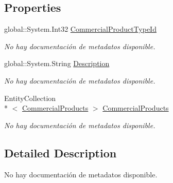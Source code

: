 \subsection*{Properties}
\begin{DoxyCompactItemize}
\item 
global\-::\-System.\-Int32 \hyperlink{class_game_memory_1_1_commercial_product_types_a259bcdf4dd877d8bae773e9c24bfe00d}{Commercial\-Product\-Type\-Id}
\begin{DoxyCompactList}\small\item\em No hay documentación de metadatos disponible. \end{DoxyCompactList}\item 
global\-::\-System.\-String \hyperlink{class_game_memory_1_1_commercial_product_types_a299effbd9ebde73b5faea55c63276e12}{Description}
\begin{DoxyCompactList}\small\item\em No hay documentación de metadatos disponible. \end{DoxyCompactList}\item 
Entity\-Collection\\*
$<$ \hyperlink{class_game_memory_1_1_commercial_products}{Commercial\-Products} $>$ \hyperlink{class_game_memory_1_1_commercial_product_types_ac8c86f5ad74f0123dfeb37b17d83eff1}{Commercial\-Products}
\begin{DoxyCompactList}\small\item\em No hay documentación de metadatos disponible. \end{DoxyCompactList}\end{DoxyCompactItemize}


\subsection{Detailed Description}
No hay documentación de metadatos disponible. 




